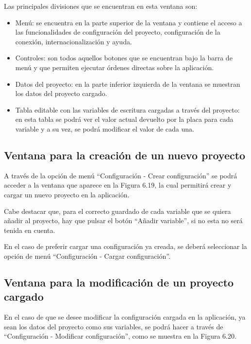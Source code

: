 Las principales divisiones que se encuentran en esta ventana son:

\begin{itemize}
	\item Menú: se encuentra en la parte superior de la ventana y contiene el acceso a las funcionalidades de configuración del proyecto, configuración de la conexión, internacionalización y ayuda.
	\item Controles: son todos aquellos botones que se encuentran bajo la barra de menú y que permiten ejecutar órdenes directas sobre la aplicación.
	\item Datos del proyecto: en la parte inferior izquierda de la ventana se muestran los datos del proyecto cargado.
	\item Tabla editable con las variables de escritura cargadas a través del proyecto: en esta tabla se podrá ver el valor actual devuelto por la placa para cada variable y a su vez, se podrá modificar el valor de cada una.
\end{itemize}


\subsection{Ventana para la creación de un nuevo proyecto}

A través de la opción de menú ``Configuración - Crear configuración'' se podrá acceder a la ventana que aparece en la Figura 6.19, la cual permitirá crear y cargar un nuevo proyecto en la aplicación.

Cabe destacar que, para el correcto guardado de cada variable que se quiera añadir al proyecto, hay que pulsar el botón ``Añadir variable'', si no esta no será tenida en cuenta.


En el caso de preferir cargar una configuración ya creada, se deberá seleccionar la opción de menú ``Configuración - Cargar configuración''.

\subsection{Ventana para la modificación de un proyecto cargado}

En el caso de que se desee modificar la configuración cargada en la aplicación, ya sean los datos del proyecto como sus variables, se podrá hacer a través de ``Configuración - Modificar configuración'', como se muestra en la Figura 6.20.


